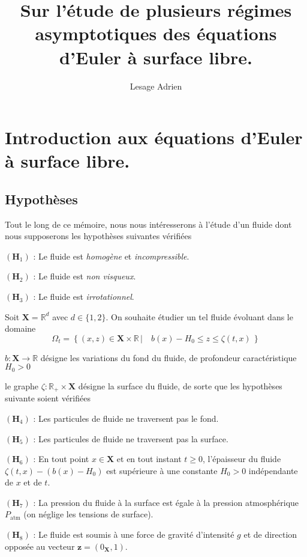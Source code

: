 \documentclass[12pt,a4paper]{article}
\numberwithin{equation}{section}
\begin{document}
\title{Sur l'étude de plusieurs régimes asymptotiques des équations d'Euler à surface libre.}
\author{Lesage Adrien}
\maketitle
\newpage
\tableofcontents
\newpage
\section{Introduction aux équations d'Euler à surface libre.}
\subsection{Hypothèses}

Tout le long de ce mémoire, nous nous intéresserons à l'étude d'un fluide dont nous supposerons les hypothèses suivantes vérifiées
\begin{list}{}{}
    \item[$(\textbf{H}_1)$ : ] Le fluide est \textit{homogène} et \textit{incompressible}.
    \item[$(\textbf{H}_2)$ : ] Le fluide est \textit{non visqueux}.
    \item[$(\textbf{H}_3)$ : ] Le fluide est \textit{irrotationnel}.
\end{list}

Soit $\textbf{X} = \mathbb{R}^d$ avec $d \in \{1,2\}$. On souhaite étudier un tel fluide évoluant dans le domaine $$\Omega_t = \left\{ (x,z) \in \textbf{X}\times\mathbb{R}  \,|\quad b(x) - H_0 \leq z \leq \zeta(t,x) \,\right\}$$
\begin{list}{}{}
\item[\textbullet] $b : \textbf{X}\rightarrow \mathbb{R}$ désigne les variations du fond du fluide, de profondeur caractéristique $H_0 > 0$
\item[\textbullet] le graphe $\zeta : \mathbb{R}_+\times \textbf{X}$ désigne la surface du fluide, de sorte que les hypothèses suivante soient vérifiées
\end{list}
\begin{list}{}{}
    \item[$(\textbf{H}_4)$ : ] Les particules de fluide ne traversent pas le fond.
    \item[$(\textbf{H}_5)$ : ] Les particules de fluide ne traversent pas la surface.
    \item[$(\textbf{H}_6)$ : ]  En tout point $x\in\textbf{X}$ et en tout instant $t\geq 0$, l'épaisseur du fluide $\zeta(t,x) - (b(x)-H_0)$ est supérieure à une constante $H_0>0$ indépendante de $x$ et de $t$.
    \item[$(\textbf{H}_7)$ : ] La pression  du fluide à la surface est égale à la pression atmosphérique $P_{\text{atm}}$ (on néglige les tensions de surface).
    \item[$(\textbf{H}_8)$ : ] Le fluide est soumis à une force de gravité d'intensité $g$ et de direction opposée au vecteur $\textbf{z} = (0_{\textbf{X}},1)$.
\end{list}
\end{document}
